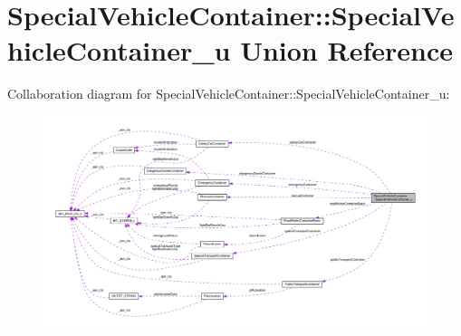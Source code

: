 \hypertarget{unionSpecialVehicleContainer_1_1SpecialVehicleContainer__u}{}\section{Special\+Vehicle\+Container\+:\+:Special\+Vehicle\+Container\+\_\+u Union Reference}
\label{unionSpecialVehicleContainer_1_1SpecialVehicleContainer__u}


Collaboration diagram for Special\+Vehicle\+Container\+:\+:Special\+Vehicle\+Container\+\_\+u\+:\nopagebreak
\begin{figure}[H]
\begin{center}
\leavevmode
\includegraphics[width=350pt]{unionSpecialVehicleContainer_1_1SpecialVehicleContainer__u__coll__graph}
\end{center}
\end{figure}
